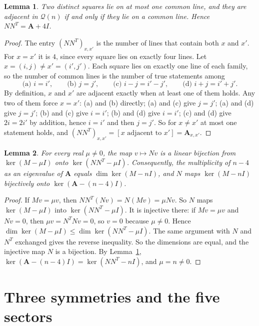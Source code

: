 \documentclass[11pt]{amsart}
\theoremstyle{plain}
\newtheorem{lemma}{Lemma}
\theoremstyle{definition}
\theoremstyle{remark}
\numberwithin{equation}{section}
\newcommand{\QG}{\mathcal{Q}}          %
\newcommand{\Adj}{\mathbf{A}}          %
\newcommand{\iv}[1]{[#1]}              %
\begin{document}
\begin{lemma}\label{lem:clique}
Two distinct squares lie on at most one common line, and they are adjacent in \(\QG(n)\)
if and only if they lie on a common line. Hence \(NN^{T}=\Adj+4I\).
\end{lemma}

\begin{proof}
The entry \((NN^{T})_{x,x'}\) is the number of lines that contain both \(x\) and \(x'\).
For \(x=x'\) it is \(4\), since every square lies on exactly four lines. Let
\(x=(i,j)\ne x'=(i',j')\). Each square lies on exactly one line of each family, so the
number of common lines is the number of true statements among
\[
\text{(a) } i=i',\qquad \text{(b) } j=j',\qquad \text{(c) } i-j=i'-j',\qquad
\text{(d) } i+j=i'+j'.
\]
By definition, \(x\) and \(x'\) are adjacent exactly when at least one of them holds. Any
two of them force \(x=x'\): (a) and (b) directly; (a) and (c) give \(j=j'\); (a) and (d)
give \(j=j'\); (b) and (c) give \(i=i'\); (b) and (d) give \(i=i'\); (c) and (d) give
\(2i=2i'\) by addition, hence \(i=i'\) and then \(j=j'\). So for \(x\ne x'\) at most one
statement holds, and \((NN^{T})_{x,x'}=\iv{x\text{ adjacent to }x'}=\Adj_{x,x'}\).
\end{proof}

\begin{lemma}\label{lem:gram}
For every real \(\mu\ne0\), the map \(v\mapsto Nv\) is a linear bijection from
\(\ker(M-\mu I)\) onto \(\ker(NN^{T}-\mu I)\). Consequently, the multiplicity of \(n-4\)
as an eigenvalue of \(\Adj\) equals \(\dim\ker(M-nI)\), and \(N\) maps \(\ker(M-nI)\)
bijectively onto \(\ker(\Adj-(n-4)I)\).
\end{lemma}

\begin{proof}
If \(Mv=\mu v\), then \(NN^{T}(Nv)=N(Mv)=\mu Nv\). So \(N\) maps \(\ker(M-\mu I)\) into
\(\ker(NN^{T}-\mu I)\). It is injective there: if \(Mv=\mu v\) and \(Nv=0\), then
\(\mu v=N^{T}Nv=0\), so \(v=0\) because \(\mu\ne0\). Hence
\(\dim\ker(M-\mu I)\le\dim\ker(NN^{T}-\mu I)\). The same argument with \(N\) and \(N^{T}\)
exchanged gives the reverse inequality. So the dimensions are equal, and the injective
map \(N\) is a bijection. By Lemma~\ref{lem:clique},
\(\ker(\Adj-(n-4)I)=\ker(NN^{T}-nI)\), and \(\mu=n\ne0\).
\end{proof}

\section{Three symmetries and the five sectors}\label{sec:sectors}
\end{document}
